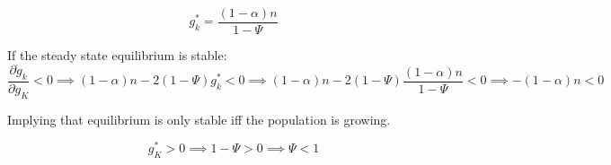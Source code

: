 \begin{equation*}
    g_{k}^*=\frac{(1-\alpha)n}{1-\Psi}
\end{equation*}

If the steady state equilibrium is stable: 
\begin{equation*}
    \frac{\partial \Dot{g}_{k}}{\partial g_{K}}<0 \implies(1-\alpha)n-2(1-\Psi)g_{k}^*<0 \implies (1-\alpha)n-2(1-\Psi)\frac{(1-\alpha)n}{1-\Psi}<0 \implies 
    -(1-\alpha)n<0 
\end{equation*}


Implying that equilibrium is only stable iff the population is growing. 

\begin{equation*}
    g_{K}^*>0 \implies 1-\Psi>0 \implies \Psi<1
\end{equation*}



